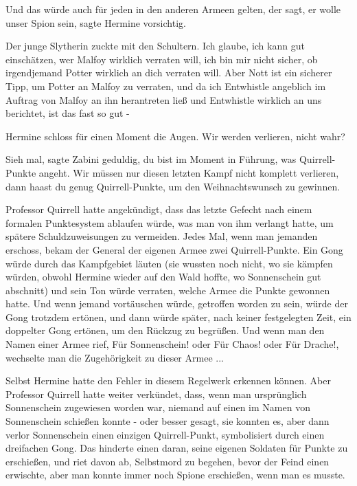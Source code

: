 \glqq{}Und das würde auch für jeden in den anderen Armeen gelten, der sagt, er
wolle unser Spion sein\grqq{}, sagte Hermine vorsichtig.

Der junge Slytherin zuckte mit den Schultern. \glqq{}Ich glaube, ich kann gut
einschätzen, wer Malfoy wirklich verraten will, ich bin mir nicht sicher, ob
irgendjemand Potter wirklich an dich verraten will. Aber Nott ist ein sicherer
Tipp, um Potter an Malfoy zu verraten, und da ich Entwhistle angeblich im
Auftrag von Malfoy an ihn herantreten ließ und Entwhistle wirklich an uns
berichtet, ist das fast so gut -\grqq{}

Hermine schloss für einen Moment die Augen. \glqq{}Wir werden verlieren, nicht
wahr?\grqq{}

\glqq{}Sieh mal\grqq{}, sagte Zabini geduldig, \glqq{}du bist im Moment in
Führung, was Quirrell-Punkte angeht. Wir müssen nur diesen letzten Kampf nicht
komplett verlieren, dann haast du genug Quirrell-Punkte, um den Weihnachtswunsch
zu gewinnen.\grqq{}

Professor Quirrell hatte angekündigt, dass das letzte Gefecht nach einem
formalen Punktesystem ablaufen würde, was man von ihm verlangt hatte, um spätere
Schuldzuweisungen zu vermeiden. Jedes Mal, wenn man jemanden erschoss, bekam der
General der eigenen Armee zwei Quirrell-Punkte. Ein Gong würde durch das
Kampfgebiet läuten (sie wussten noch nicht, wo sie kämpfen würden, obwohl
Hermine wieder auf den Wald hoffte, wo Sonnenschein gut abschnitt) und sein Ton
würde verraten, welche Armee die Punkte gewonnen hatte. Und wenn jemand
vortäuschen würde, getroffen worden zu sein, würde der Gong trotzdem ertönen,
und dann würde später, nach keiner festgelegten Zeit, ein doppelter Gong
ertönen, um den Rückzug zu begrüßen. Und wenn man den Namen einer Armee rief,
\glqq{}Für Sonnenschein!\grqq{} oder \glqq{}Für Chaos!\grqq{} oder \glqq{}Für
Drache!\grqq{}, wechselte man die Zugehörigkeit zu dieser Armee ...

Selbst Hermine hatte den Fehler in diesem Regelwerk erkennen können. Aber
Professor Quirrell hatte weiter verkündet, dass, wenn man ursprünglich
Sonnenschein zugewiesen worden war, niemand auf einen im Namen von Sonnenschein
schießen konnte - oder besser gesagt, sie konnten es, aber dann verlor
Sonnenschein einen einzigen Quirrell-Punkt, symbolisiert durch einen dreifachen
Gong. Das hinderte einen daran, seine eigenen Soldaten für Punkte zu erschießen,
und riet davon ab, Selbstmord zu begehen, bevor der Feind einen erwischte, aber
man konnte immer noch Spione erschießen, wenn man es musste.

